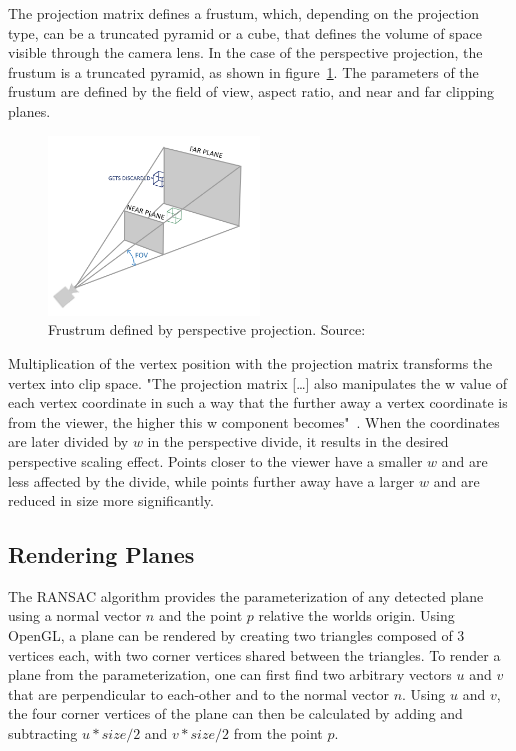 The projection matrix defines a frustum, which, depending on the projection type, can be a truncated pyramid or a cube,
that defines the volume of space visible through the camera lens.
In the case of the perspective projection, the frustum is a truncated pyramid, as shown in figure~\ref{fig:perspective}.
The parameters of the frustum are defined by the field of view, aspect ratio, and near and far clipping planes.
\begin{figure}[h!]
    \centering
    \includegraphics[width=0.50\textwidth]{images/perspective}
    \caption{Frustrum defined by perspective projection. Source: \cite{de_vries_learn_2020}}
    \label{fig:perspective}
\end{figure}
Multiplication of the vertex position with the projection matrix transforms the vertex into clip space.
"The projection matrix [\ldots] also manipulates the w value of each vertex coordinate in such a way
that the further away a vertex coordinate is from the viewer, the higher this w component becomes"~\parencite{de_vries_learn_2020}.
When the coordinates are later divided by $w$ in the perspective divide,
it results in the desired perspective scaling effect.
Points closer to the viewer have a smaller $w$ and are less affected by the divide,
while points further away have a larger $w$ and are reduced in size more significantly.


\subsection{Rendering Planes}\label{subsec:rendering-planes}
The RANSAC algorithm provides the parameterization of any detected plane using a normal vector $n$ and the point $p$ relative the worlds origin.
Using OpenGL, a plane can be rendered by creating two triangles composed of 3 vertices each, with two corner vertices shared between the triangles.
To render a plane from the parameterization, one can first find two arbitrary vectors $u$ and $v$
that are perpendicular to each-other and to the normal vector $n$.
Using $u$ and $v$, the four corner vertices of the plane can then be calculated by adding and subtracting $u * size / 2$ and $v * size / 2$ from the point $p$.

